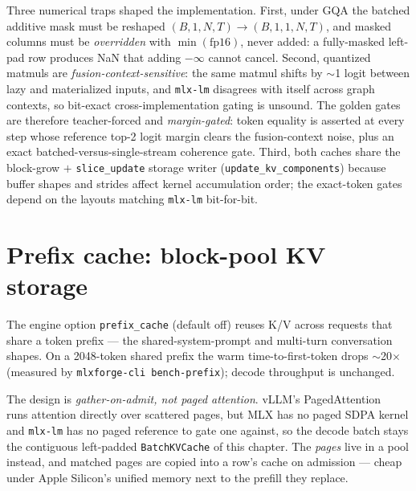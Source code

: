 \documentclass[11pt,a4paper]{report}
\newcommand{\code}[1]{\texttt{#1}}
\begin{document}
Three numerical traps shaped the implementation. First, under GQA the batched
additive mask must be reshaped $(B,1,N,T)\to(B,1,1,N,T)$, and masked columns
must be \emph{overridden} with $\min(\text{fp16})$, never added: a fully-masked
left-pad row produces NaN that adding $-\infty$ cannot cancel. Second, quantized
matmuls are \emph{fusion-context-sensitive}: the same matmul shifts by $\sim$1
logit between lazy and materialized inputs, and \code{mlx-lm} disagrees with
itself across graph contexts, so bit-exact cross-implementation gating is
unsound. The golden gates are therefore teacher-forced and \emph{margin-gated}:
token equality is asserted at every step whose reference top-2 logit margin
clears the fusion-context noise, plus an exact batched-versus-single-stream
coherence gate. Third, both caches share the block-grow $+$
\code{slice\_update} storage writer (\code{update\_kv\_components}) because
buffer shapes and strides affect kernel accumulation order; the exact-token
gates depend on the layouts matching \code{mlx-lm} bit-for-bit.

\section{Prefix cache: block-pool KV storage}
\label{sec:prefixcache}
The engine option \code{prefix\_cache} (default off) reuses K/V across requests
that share a token prefix --- the shared-system-prompt and multi-turn
conversation shapes. On a 2048-token shared prefix the warm time-to-first-token
drops $\sim$20$\times$ (measured by \code{mlxforge-cli bench-prefix}); decode
throughput is unchanged.

The design is \emph{gather-on-admit, not paged attention}. vLLM's
PagedAttention~\citep{kwon2023vllm} runs attention directly over scattered
pages, but MLX has no paged SDPA kernel and \code{mlx-lm} has no paged reference
to gate one against, so the decode batch stays the contiguous left-padded
\code{BatchKVCache} of this chapter. The \emph{pages} live in a pool instead,
and matched pages are copied into a row's cache on admission --- cheap under
Apple Silicon's unified memory next to the prefill they replace.
\end{document}
